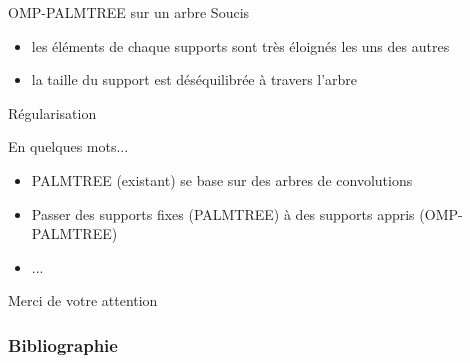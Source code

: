 \begin{frame}{OMP-PALMTREE sur un arbre}
Soucis
\begin{itemize}
	\item les éléments de chaque supports sont très éloignés les uns des autres
	\item la taille du support est déséquilibrée à travers l'arbre
\end{itemize}
\end{frame}


\begin{frame}{Régularisation}
\end{frame}


\begin{frame}{En quelques mots...}
\begin{itemize}
\item PALMTREE (existant) se base sur des arbres de convolutions
\item Passer des supports fixes (PALMTREE) à des supports appris (OMP-PALMTREE)
\item ...
\end{itemize}
\vfill
\hfill Merci de votre attention
\end{frame}

\appendix

\begin{frame}
\frametitle{Bibliographie}
\printbibliography[heading=none]
\end{frame}


